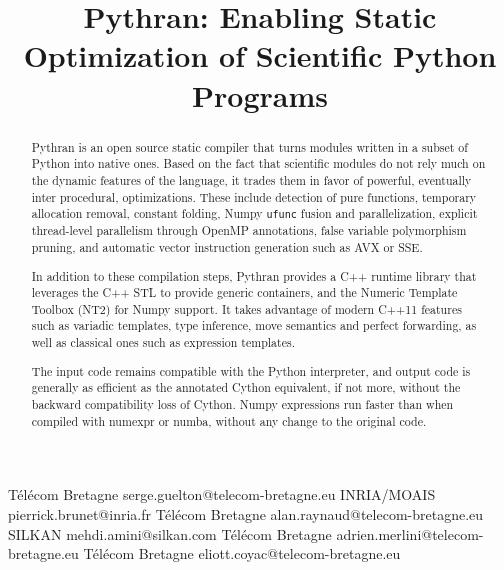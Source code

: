 \documentclass[10pt, onecolumn, preprint]{sigplanconf}
\begin{document}
\title{Pythran: Enabling Static Optimization of Scientific Python Programs}

           {T{\'e}l{\'e}com Bretagne}
           {serge.guelton@telecom-bretagne.eu}
           {INRIA/MOAIS}
           {pierrick.brunet@inria.fr}
           {T{\'e}l{\'e}com Bretagne}
           {alan.raynaud@telecom-bretagne.eu}
           {SILKAN}
           {mehdi.amini@silkan.com}
           {T{\'e}l{\'e}com Bretagne}
           {adrien.merlini@telecom-bretagne.eu}
           {T{\'e}l{\'e}com Bretagne}
           {eliott.coyac@telecom-bretagne.eu}

\maketitle

\begin{abstract}

    Pythran is an open source static compiler that turns modules written
    in a subset of Python into native ones. Based on the fact that scientific
    modules do not rely much on the dynamic features of the language, it trades
    them in favor of powerful, eventually inter procedural, optimizations.
    These include detection of pure functions, temporary allocation removal,
    constant folding, Numpy \texttt{ufunc} fusion and parallelization, explicit
    thread-level parallelism through OpenMP annotations, false variable
    polymorphism pruning, and automatic vector instruction generation such as
    AVX or SSE.

    In addition to these compilation steps, Pythran provides a C++ runtime library that
    leverages the C++ STL to provide generic containers, and the Numeric
    Template Toolbox (NT2) for Numpy support. It takes advantage of modern C++11
    features such as variadic templates, type inference, move semantics and
    perfect forwarding, as well as classical ones such as expression templates.
    

    The input code remains compatible with the Python interpreter, and output
    code is generally as efficient as the annotated Cython equivalent, if not
    more, without the backward compatibility loss of Cython. Numpy expressions
    run faster than when compiled with numexpr or numba, without any change to
    the original code. 


\end{abstract}
\end{document}
